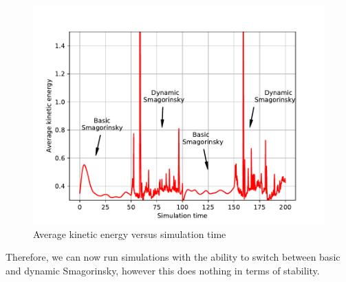 \begin{figure}[H]
    \includegraphics[height=0.4\textheight]{media/ke-avg-DS-00-60}
    \caption{Average kinetic energy versus simulation time}
    \label{fig:bs-ds-smagorinsky}
\end{figure}

Therefore, we can now run simulations with the ability to switch between
basic and dynamic Smagorinsky, however this does nothing in terms of
stability. 
